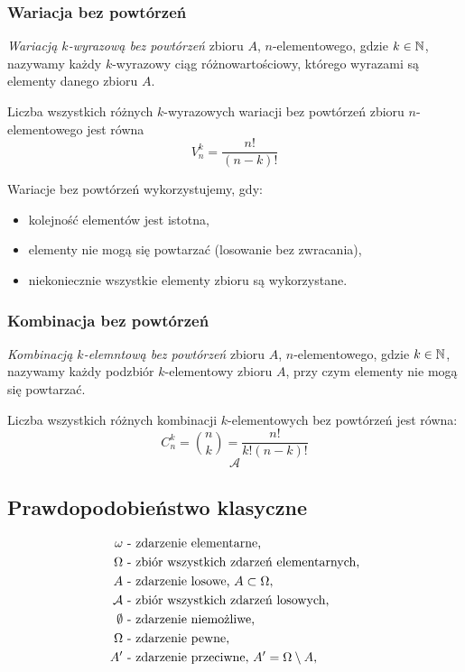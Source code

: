 \documentclass[../Matematyka.tex]{subfiles}
\begin{document}
    \newpage
    \subsubsection{Wariacja bez powtórzeń}
    \textit{Wariacją \(k\)-wyrazową bez powtórzeń} zbioru \(A\), \(n\)-elementowego, gdzie \(k\in\mathbb{N}\), 
    nazywamy każdy \(k\)-wyrazowy ciąg różnowartościowy, którego wyrazami są elementy danego zbioru \(A\).

    Liczba wszystkich różnych \(k\)-wyrazowych wariacji bez powtórzeń zbioru \(n\)-elementowego jest równa
    \[V_n^k=\frac{n!}{(n-k)!}\]

    Wariacje bez powtórzeń wykorzystujemy, gdy:
    \begin{itemize}
        \item kolejność elementów jest istotna,
        \item elementy nie mogą się powtarzać (losowanie bez zwracania),
        \item niekoniecznie wszystkie elementy zbioru są wykorzystane.
    \end{itemize}

    \subsubsection{Kombinacja bez powtórzeń}
    \textit{Kombinacją \(k\)-elemntową bez powtórzeń} zbioru \(A\), \(n\)-elementowego, gdzie \(k\in\mathbb{N}\), 
    nazywamy każdy podzbiór \(k\)-elementowy zbioru \(A\), przy czym elementy nie mogą się powtarzać.

    Liczba wszystkich różnych kombinacji \(k\)-elementowych bez powtórzeń jest równa:
    \[C_n^k=\binom{n}{k}=\frac{n!}{k!(n-k)!}\]
    \[\mathcal{A}\]

    \subsection{Prawdopodobieństwo klasyczne}
    \begin{align*}
        \omega& \text{ - zdarzenie elementarne,}\\
        \Omega& \text{ - zbiór wszystkich zdarzeń elementarnych,}\\
        A& \text{ - zdarzenie losowe, } A \subset \Omega,\\
        \mathcal{A} & \text{ - zbiór wszystkich zdarzeń losowych,}\\
        \emptyset& \text{ - zdarzenie niemożliwe,}\\
        \Omega& \text{ - zdarzenie pewne,}\\
        A^\prime& \text{ - zdarzenie przeciwne, } A^\prime = \Omega \setminus A,\\
    \end{align*}
\end{document}
